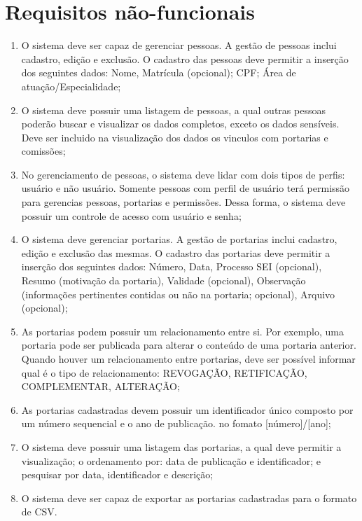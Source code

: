 \documentclass{scrreprt}
\begin{document}
\section{Requisitos não-funcionais}
\begin{enumerate}[label=\textbf{RF-\arabic*}]
\setcounter{RF}{1}
\item
O sistema deve ser capaz de gerenciar pessoas. A gestão de pessoas inclui cadastro, edição e exclusão. O cadastro das pessoas deve permitir a inserção dos seguintes dados: Nome, Matrícula (opcional); CPF; Área de atuação/Especialidade;

\item
O sistema deve possuir uma listagem de pessoas, a qual outras pessoas poderão  buscar e visualizar os dados completos, exceto os dados sensíveis. Deve ser incluido na visualização dos dados os vinculos com portarias e comissões;

\item
No gerenciamento de pessoas, o sistema deve lidar com dois tipos de perfis:
usuário e não usuário. Somente pessoas com perfil de usuário terá permissão para gerencias pessoas, portarias e permissões. Dessa forma, o sistema deve possuir um controle de acesso com usuário e senha;

\item
O sistema deve gerenciar portarias. A gestão de portarias inclui cadastro, edição e exclusão das mesmas. O cadastro das portarias deve permitir a inserção dos seguintes dados: Número, Data, Processo SEI (opcional), Resumo (motivação da portaria), Validade (opcional), Observação (informações pertinentes contidas ou não na portaria; opcional), Arquivo (opcional);

\item
As portarias podem possuir um relacionamento entre si. Por exemplo, uma portaria pode ser publicada para alterar o conteúdo de uma portaria anterior. Quando houver um relacionamento entre portarias, deve ser possível informar qual é o tipo de relacionamento: REVOGAÇÃO, RETIFICAÇÃO, COMPLEMENTAR, ALTERAÇÃO;

\item
As portarias cadastradas devem possuir um identificador único composto por um número sequencial e o ano de publicação. no fomato [número]/[ano];

\item
O sistema deve possuir uma listagem das portarias, a qual deve permitir a visualização; o ordenamento por:  data de publicação e identificador; e pesquisar por data, identificador e descrição;

\item
O sistema deve ser capaz de exportar as portarias cadastradas para o formato de CSV.

\end{enumerate}
\end{document}
